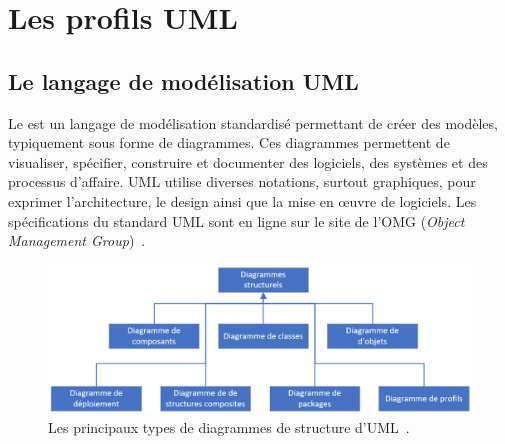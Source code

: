 \chapter{Les profils UML}
\label{chap.profils-UML}
\section{Le langage de modélisation UML}

Le  est un langage de modélisation standardisé permettant de créer des mod\`eles, typiquement sous forme de diagrammes.
Ces diagrammes permettent de visualiser, spécifier, construire et documenter des logiciels, des systèmes et des processus d'affaire.
UML utilise diverses notations,  surtout graphiques, pour exprimer l'architecture, le design ainsi que la mise en \oe{}uvre de logiciels.
Les spécifications du standard UML sont en ligne sur le site de l'OMG (\emph{Object Management Group})~\cite{OMG_UML}.




 
\begin{figure}
    \centering
    \includegraphics[width=12cm]{10_img/chap4/structure.PNG}
    \caption{Les principaux types de diagrammes de structure d'UML~\cite{OMG_UML}.}
    \label{fig.uml_struc}
\end{figure}

